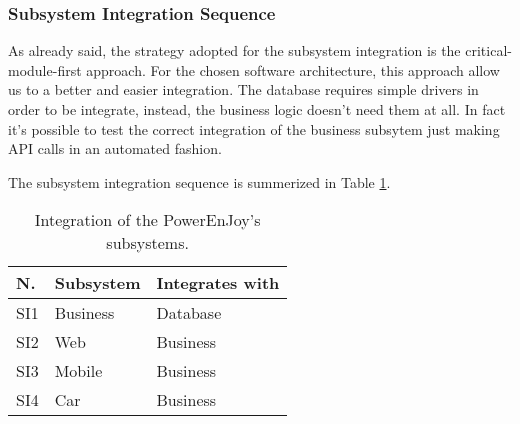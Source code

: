 \subsubsection{Subsystem Integration Sequence} \label{subsystem integration}

As already said, the strategy adopted for the subsystem integration is the critical-module-first approach. For the chosen software architecture, this approach allow us to a better and easier integration. The database requires simple drivers in order to be integrate, instead, the business logic doesn't need them at all. In fact it's possible to test the correct integration of the business subsytem just making API calls in an automated fashion.

The subsystem integration sequence is summerized in Table \ref{subsystems sequence}.

\begin{table}[H]
    \centering
    \begin{tabular}{| l | l | l |}
        \hline
        \textbf{N.} & \textbf{Subsystem} & \textbf{Integrates with} \\
        \hline
        SI1 & Business & Database\\
        SI2 & Web & Business\\
        SI3 & Mobile & Business \\
        SI4 & Car & Business \\
        \hline
    \end{tabular}
    \caption{Integration of the PowerEnJoy's subsystems.}
    \label{subsystems sequence}
\end{table}